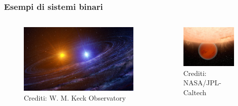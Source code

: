 \documentclass[10pt]{beamer}
\begin{document}
\begin{frame}
  \frametitle{Esempi di sistemi binari}
  \begin{columns}
    \begin{column}{0.48\columnwidth}
      \begin{figure}
        \centering
        \includegraphics[width=\columnwidth]{presentazione/ophiuchi_binary_system}
        \caption{Crediti: W. M. Keck Observatory}
      \end{figure}
    \end{column}
    \begin{column}{0.48\columnwidth}
      \begin{figure}
        \centering
        \includegraphics[width=\columnwidth]{presentazione/star-planet}
        \caption{Crediti: NASA/JPL-Caltech}
      \end{figure}
    \end{column}
  \end{columns}
\end{frame}
\end{document}
